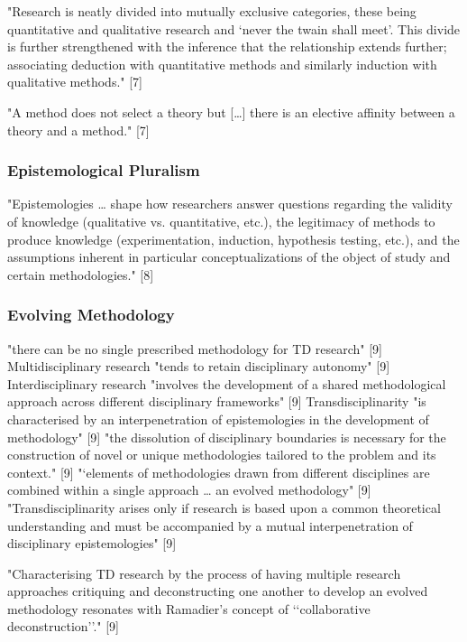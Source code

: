 "Research is neatly divided into mutually exclusive categories, these being quantitative and qualitative research and ‘never the twain shall meet’. This divide is further strengthened with the inference that the relationship extends further; associating deduction with quantitative methods and similarly induction with qualitative methods." [7]

"A method does not select a theory but […] there is an elective affinity between a theory and a method." [7]

\subsubsection{Epistemological Pluralism}

"Epistemologies … shape how researchers answer questions regarding the validity of knowledge (qualitative vs. quantitative, etc.), the legitimacy of methods to produce knowledge (experimentation, induction, hypothesis testing, etc.), and the assumptions inherent in particular conceptualizations of the object of study and certain methodologies." [8]

\subsubsection{Evolving Methodology}

"there can be no single prescribed methodology for TD research" [9]
Multidisciplinary research "tends to retain disciplinary autonomy" [9]
Interdisciplinary research "involves the development of a shared methodological approach across different disciplinary frameworks" [9]
Transdisciplinarity "is characterised by an interpenetration of epistemologies in the development of methodology" [9] "the dissolution of disciplinary boundaries is necessary for the construction of novel or unique methodologies tailored to the problem and its context." [9] "‘elements of methodologies drawn from different disciplines are combined within a single approach … an evolved methodology" [9] "Transdisciplinarity arises only if research is based upon a common theoretical understanding and must be accompanied by a mutual interpenetration of disciplinary epistemologies" [9]

"Characterising TD research by the process of having multiple research approaches critiquing and deconstructing one another to develop an evolved methodology resonates with Ramadier’s concept of ‘‘collaborative deconstruction’’." [9]

